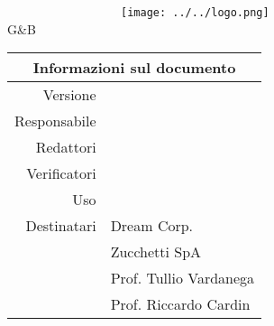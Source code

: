 \maketitle
	\begin{center}
	~~~~~~~~~~~~~~~~~~\texttt{[image: ../../logo.png]}
	\newline
	\huge 
	\\G\&B
	
	\begin{table}[!htpb]
		\centering
		\begin{tabular}{r|l}
			\multicolumn{2}{c}{Informazioni sul documento}\\
			\hline
			Versione & \version \\
			Responsabile & \res\\
			Redattori & \red \\
			Verificatori & \verp\\
			Uso & \use\\
			Destinatari & Dream Corp. \\
			& Zucchetti SpA\\
			& Prof. Tullio Vardanega\\
			& Prof. Riccardo Cardin\\
		\end{tabular}
	\end{table}
	
	\end{center}
	\newpage
	~
	
	\clearpage
	\newpage
	\tableofcontents
	\newpage
	\listoftables
	\listoffigures
	\newpage

